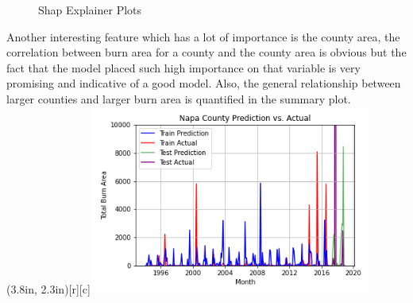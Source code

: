 \documentclass[12pt]{article}
\begin{document}
\begin{figure}
    \caption{Shap Explainer Plots}
\end{figure}

Another interesting feature which has a lot of importance is the county area, the correlation between burn area for a county and the county area is obvious but the fact that the model placed such high importance on that variable is very promising and indicative of a good model. Also, the general relationship between larger counties and larger burn area is quantified in the summary plot. \\

\parpic(3.8in, 2.3in)[r][c]{\includegraphics[width=3.65in]{./img/NapaPredPlot.png}}
\end{document}
